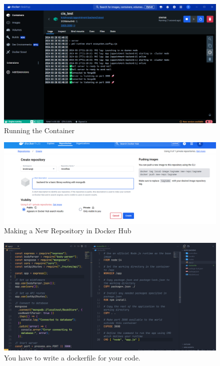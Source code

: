 \documentclass[11pt]{article}
\begin{document}
\begin{figure}[H]
    \centering
    \includegraphics[width=.95\textwidth]{running container.png}
    \caption{Running the Container}
\end{figure}

\begin{figure}[H]
    \centering
    \includegraphics[width=.95\textwidth]{creating a repo.png}
    \caption{Making a New Repository in Docker Hub}
\end{figure}

\begin{figure}[H]
    \centering
    \includegraphics[width=.95\textwidth]{dockerfile.png}
    \caption{You have to write a dockerfile for your code. }
\end{figure}
\end{document}
